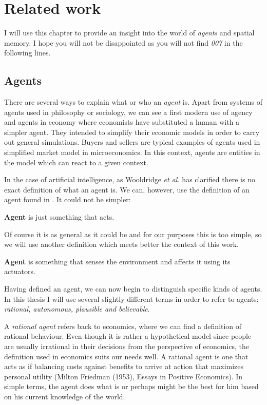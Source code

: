 \chapter{Related work}

I will use this chapter to provide an insight into the world of \emph{agents} and spatial memory. I hope you will not be disappointed as you will not find \textit{007} in the following lines.

\section{Agents}

There are several ways to explain what or who an \emph{agent} is. Apart from systems of agents used in philosophy or sociology, we can see a first modern use of agency and agents in economy where economists have substituted a human with a simpler agent. They intended to simplify their economic models in order to carry out general simulations. Buyers and sellers are typical examples of agents used in simplified market model in microeconomics. In this context, agents are entities in the model which can react to a given context.

In the case of artificial intelligence, as Wooldridge \textit{et al.} has clarified there is no exact definition of what an agent is. \cite{Wooldridge:intelligentagents} We can, however, use the definition of an agent found in \cite{russel2003ai}. It could not be simpler:

\begin{definition}{\bf Agent} is just something that acts.
\end{definition} 

Of course it is as general as it could be and for our purposes this is too simple, so we will use another definition which meets better the context of this work.

\begin{definition}{\bf Agent} is something that senses the environment and affects it using its actuators.
\end{definition} 

Having defined an agent, we can now begin to distinguish specific kinds of agents. In this thesis I will use several slightly different terms in order to refer to agents: \emph{rational, autonomous, plausible and believable}. 

A \emph{rational agent} refers back to economics, where we can find a definition of rational behaviour. Even though it is rather a hypothetical model since people are usually irrational in their decisions from the perspective of economics, the definition used in economics suits our needs well. A rational agent is one that acts as if balancing costs against benefits to arrive at action that maximizes personal utility (Milton Friedman (1953), Essays in Positive Economics). In simple terms, the agent does what is or perhaps might be the best for him based on his current knowledge of the world.
 

